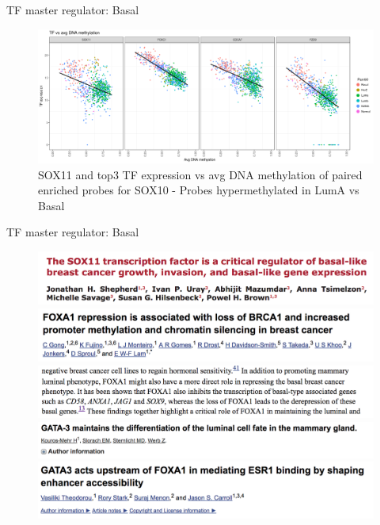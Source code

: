 \documentclass[slidestop,compress,11pt,xcolor=dvipsnames]{beamer}
\begin{document}
\begin{frame}{TF master regulator: Basal}

 \begin{figure}[ht!]
  \centering
  \includegraphics[width=1.0\textwidth]{ELMER/SOX10_TF.png}
  \caption{\label{fig:chiapet} SOX11 and top3 TF expression vs avg DNA methylation of paired enriched probes for SOX10 - Probes hypermethylated in LumA vs Basal}
 \end{figure}
\end{frame}


\begin{frame}{TF master regulator: Basal}

 \begin{figure}[ht!]
  \centering
  \includegraphics[width=1.0\textwidth]{ELMER/SOX11_basal.png}
  \includegraphics[width=1.0\textwidth]{ELMER/SOX9_2.png}
  \includegraphics[width=1.0\textwidth]{ELMER/SOX9_1.png}
  \includegraphics[width=1.0\textwidth]{ELMER/GATA3.png}
  \includegraphics[width=1.0\textwidth]{ELMER/cofactors.png}
     \end{figure}
\end{frame}
\end{document}
